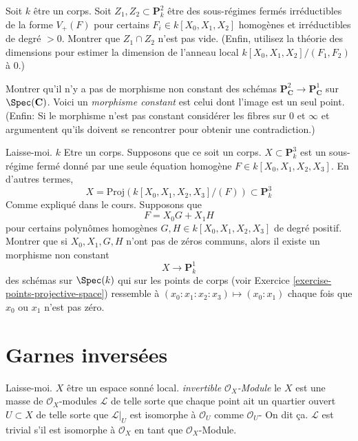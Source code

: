 \begin{exercise}
\label{exercise-bezout}
Soit $k$ être un corps. Soit $Z_1, Z_2 \subset \mathbf{P}^2_k$ être
des sous-régimes fermés irréductibles de la forme $V_{+}(F)$ pour
certains $F_i \in k[X_0, X_1, X_2]$ homogènes et irréductibles de degré $> 0$.
Montrer que $Z_1 \cap Z_2$ n'est pas
vide. (Enfin, utilisez la théorie des dimensions pour estimer la
dimension de l'anneau local $k[X_0, X_1, X_2]/(F_1, F_2)$ à $0$.)
\end{exercise}

\begin{exercise}
\label{exercise-no-nonconstant-morphism-proj}
Montrer qu'il n'y a pas de morphisme non constant
des schémas $\mathbf{P}^2_{\mathbf{C}} \to \mathbf{P}^1_{\mathbf{C}}$ sur $\Spec(\mathbf{C})$. Voici un
{\it morphisme constant} est celui dont l'image est un
seul point. (Enfin: Si le
morphisme n'est pas constant considérer les fibres sur $0$ et
$\infty$ et argumentent qu'ils doivent se rencontrer pour obtenir une contradiction.)
\end{exercise}

\begin{exercise}
\label{exercise-nonconstant-morphism}
Laisse-moi. $k$ Etre un
corps. Supposons que ce soit un corps. $X \subset \mathbf{P}^3_k$ est un
sous-régime fermé donné par une seule équation homogène $F \in k[X_0, X_1, X_2, X_3]$.
En d'autres termes,
$$
X = \text{Proj}(k[X_0, X_1, X_2, X_3]/(F)) \subset \mathbf{P}^3_k
$$
Comme expliqué dans le cours. Supposons que
$$
F = X_0 G + X_1 H
$$
pour certains polynômes homogènes $G, H \in k[X_0, X_1, X_2, X_3]$ de
degré positif. Montrer que si $X_0, X_1, G, H$ n'ont pas de zéros
communs, alors il existe un morphisme non constant
$$
X \longrightarrow \mathbf{P}^1_k
$$
des schémas sur $\Spec(k)$ qui
sur les points de corps (voir Exercice \ref{exercise-points-projective-space}) ressemble à $(x_0 : x_1
: x_2 : x_3) \mapsto (x_0 : x_1)$ chaque fois que $x_0$
ou $x_1$ n'est pas zéro.
\end{exercise}





\section{Garnes inversées}
\label{section-invertible-sheaves}

\begin{definition}
\label{definition-invertible-sheaf}
Laisse-moi. $X$ être un espace sonné
local. {\it invertible ${\mathcal O}_X$-Module} le $X$ est
une masse de ${\mathcal O}_X$-modules ${\mathcal L}$ de telle sorte que chaque point
ait un quartier ouvert $U \subset X$ de telle sorte que
${\mathcal L}|_U$ est isomorphe à ${\mathcal O}_U$ comme ${\mathcal O}_U$-
On dit ça. ${\mathcal L}$ est trivial s'il est isomorphe
à ${\mathcal O}_X$ en tant que ${\mathcal O}_X$-Module.
\end{definition}

